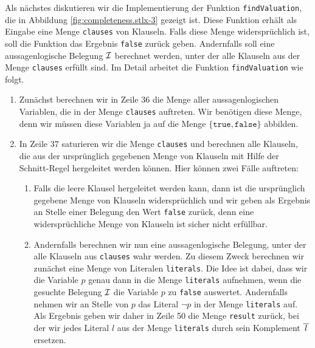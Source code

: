 Als n\"{a}chstes diskutieren wir die Implementierung der Funktion \texttt{findValuation}, die in
Abbildung \ref{fig:completeness.stlx-3} gezeigt ist.  Diese Funktion erh\"{a}lt als Eingabe eine Menge
\texttt{clauses} von Klauseln.  Falls diese Menge widerspr\"{u}chlich ist, soll die Funktion
das Ergebnis \texttt{false} zur\"{u}ck geben.  Andernfalls soll eine aussagenlogische Belegung $\mathcal{I}$ berechnet werden,
unter der alle Klauseln aus der Menge \texttt{clauses} erf\"{u}llt sind.  Im Detail arbeitet die
Funktion \texttt{findValuation} wie folgt.
\begin{enumerate}
\item Zun\"{a}chst berechnen wir in Zeile 36 die Menge aller aussagenlogischen Variablen, die in
      der Menge \texttt{clauses} auftreten.  Wir ben\"{o}tigen diese Menge, denn wir m\"{u}ssen diese
      Variablen ja auf die Menge $\{ \texttt{true}, \texttt{false} \}$ abbilden.
\item In Zeile 37 saturieren wir die Menge \texttt{clauses} und berechnen alle Klauseln, die aus der
      urspr\"{u}nglich gegebenen Menge von Klauseln mit Hilfe der Schnitt-Regel hergeleitet werden
      k\"{o}nnen.  Hier k\"{o}nnen zwei F\"{a}lle auftreten:
      \begin{enumerate}
      \item Falls die leere Klausel hergeleitet werden kann, dann ist die urspr\"{u}nglich gegebene Menge
            von Klauseln widerspr\"{u}chlich und wir geben als Ergebnis an Stelle einer Belegung den
            Wert \texttt{false} zur\"{u}ck, denn eine widerspr\"{u}chliche Menge von Klauseln ist sicher
            nicht erf\"{u}llbar.
      \item Andernfalls berechnen wir nun eine aussagenlogische Belegung, unter der alle Klauseln aus
            \texttt{clauses} wahr werden.  Zu diesem Zweck berechnen wir zun\"{a}chst eine Menge von
            Literalen \texttt{literals}.  Die Idee ist dabei, dass wir die Variable $p$ genau
            dann in die Menge \texttt{literals} aufnehmen, wenn die gesuchte Belegung $\mathcal{I}$ die
            Variable $p$ zu \texttt{false} auswertet.  Andernfalls nehmen wir an Stelle von $p$ das
            Literal $\neg p$ in der Menge \texttt{literals} auf.  Als Ergebnis geben wir daher in
            Zeile 50 die Menge \texttt{result} zur\"{u}ck, bei der wir jedes Literal $l$ aus der 
            Menge \texttt{literals} durch sein Komplement $\overline{\,l\,}$ ersetzen.  


\end{enumerate}
\end{enumerate}
